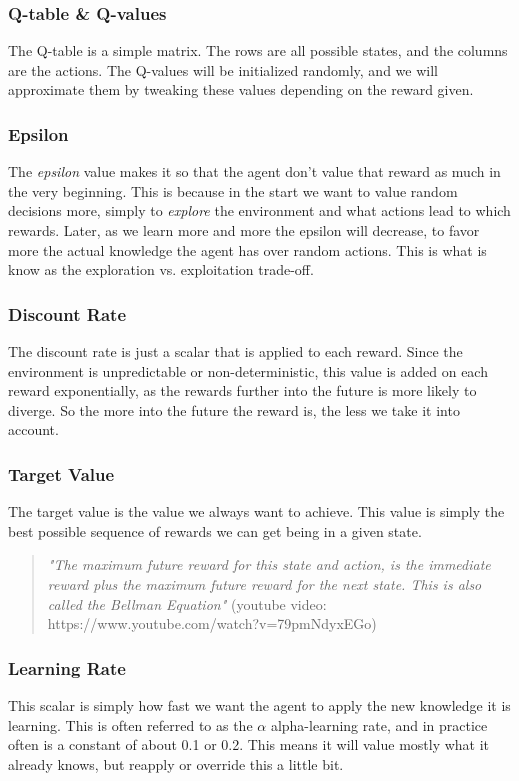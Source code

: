 \documentclass[
a4paper,
11pt,
english
]{report}
\begin{document}
\subsubsection{Q-table \& Q-values}
The Q-table is a simple matrix. The rows are all possible states, and the columns are the actions. The Q-values will be initialized randomly, and we will approximate them by tweaking these values depending on the reward given.

\subsubsection{Epsilon}
The \textit{epsilon} value makes it so that the agent don't value that reward as much in the very beginning. This is because in the start we want to value random decisions more, simply to \textit{explore} the environment and what actions lead to which rewards. Later, as we learn more and more the epsilon will decrease, to favor more the actual knowledge the agent has over random actions. This is what is know as the exploration vs. exploitation trade-off.

\subsubsection{Discount Rate}
The discount rate is just a scalar that is applied to each reward. Since the environment is unpredictable or non-deterministic, this value is added on each reward exponentially, as the rewards further into the future is more likely to diverge. So the more into the future the reward is, the less we take it into account.

\subsubsection{Target Value}
The target value is the value we always want to achieve. This value is simply the best possible sequence of rewards we can get being in a given state.

\begin{quote}
    \textit{"The maximum future reward for this state and action, is the immediate reward plus the maximum future reward for the next state. This is also called the Bellman Equation"} (youtube video: https://www.youtube.com/watch?v=79pmNdyxEGo)
\end{quote}

\subsubsection{Learning Rate}
This scalar is simply how fast we want the agent to apply the new knowledge it is learning. This is often referred to as the $\alpha$ alpha-learning rate, and in practice often is a constant of about 0.1 or 0.2. This means it will value mostly what it already knows, but reapply or override this a little bit.
\end{document}
